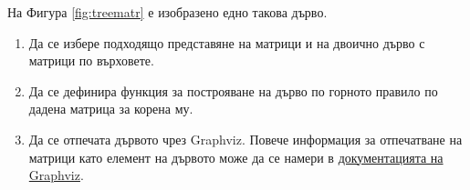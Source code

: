 \documentclass[12pt,a4paper]{article}
\begin{document}
\begin{enumerate}[resume]
	На Фигура \ref{fig:treematr} е изобразено едно такова дърво.

	\begin{enumerate}[label=\alph*)]
		\item Да се избере подходящо представяне на матрици и на двоично дърво с матрици по върховете.
		\item Да се дефинира функция за построяване на дърво по горното правило по дадена матрица за корена му.
		\item Да се отпечата дървото чрез Graphviz. Повече информация за отпечатване на матрици като елемент на дървото може да се намери в \href{https://graphviz.gitlab.io/_pages/doc/info/shapes.html}{документацията на Graphviz}.
	\end{enumerate}


\end{enumerate}

\pagebreak

\begin{thebibliography}{99}


\end{thebibliography}
\end{document}
